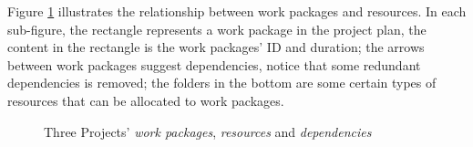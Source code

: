 Figure \ref{fig:dag} illustrates the relationship between work packages and
resources. In each sub-figure, the rectangle represents a work package in the
project plan, the content in the rectangle is the work packages' ID and
duration; the arrows between work packages suggest dependencies, notice that
some redundant dependencies is removed; the folders in the bottom are some
certain types of resources that can be allocated to work packages. 

\begin{figure}[!ht]
  \centering
  \caption{Three Projects' \emph{work packages}, \emph{resources} and \emph{dependencies}}
  \label{fig:dag}
\end{figure}



